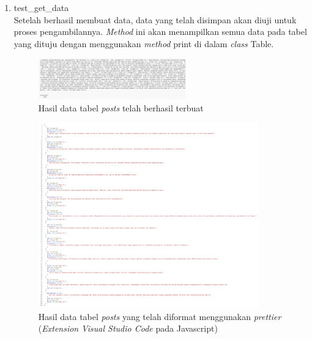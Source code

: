 \begin{enumerate}
	\item test\_get\_data \\
  Setelah berhasil membuat data, data yang telah disimpan akan diuji untuk proses pengambilannya. \emph{Method} ini akan menampilkan semua data pada tabel yang dituju dengan
  menggunakan \emph{method} print di dalam \emph{class} Table.
  \begin{figure}[H]
  	\centering{}
	\includegraphics[width=0.6\textwidth]{gambar/bab4/test-get-data-posts.png}
  	\caption{Hasil data tabel \emph{posts} telah berhasil terbuat}
   \end{figure}
  \begin{figure}[H]
  	\centering{}
	\includegraphics[width=0.9\textwidth]{gambar/bab4/test-get-data-posts-beautify.png}
  	\caption{Hasil data tabel \emph{posts} yang telah diformat menggunakan \emph{prettier} (\emph{Extension} \emph{Visual Studio Code} pada Javascript)}
   \end{figure}


\end{enumerate}
